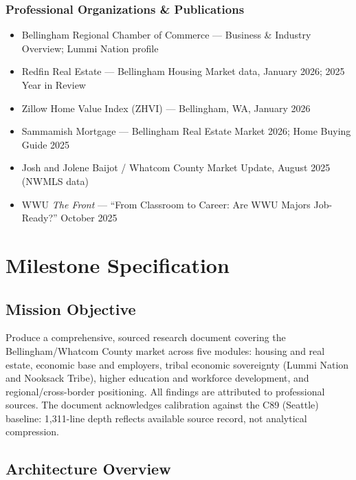 \documentclass[11pt,letterpaper]{article}
\newcommand{\stageheader}[2]{%
  \noindent\colorbox{#2}{\makebox[\textwidth][l]{%
    \textcolor{white}{\bfseries\sffamily\hspace{6pt}#1\hspace{6pt}}}}%
  \vspace{0.5em}\par%
}
\begin{document}
\subsubsection{Professional Organizations \& Publications}
\begin{itemize}[leftmargin=*]
  \item Bellingham Regional Chamber of Commerce --- Business \& Industry Overview; Lummi Nation profile
  \item Redfin Real Estate --- Bellingham Housing Market data, January 2026; 2025 Year in Review
  \item Zillow Home Value Index (ZHVI) --- Bellingham, WA, January 2026
  \item Sammamish Mortgage --- Bellingham Real Estate Market 2026; Home Buying Guide 2025
  \item Josh and Jolene Baijot / Whatcom County Market Update, August 2025 (NWMLS data)
  \item WWU \emph{The Front} --- ``From Classroom to Career: Are WWU Majors Job-Ready?'' October 2025
\end{itemize}

\newpage
\stageheader{STAGE 3 --- MISSION PACKAGE}{tertiary}

\section{Milestone Specification}

\subsection{Mission Objective}

Produce a comprehensive, sourced research document covering the Bellingham/Whatcom County market across five modules: housing and real estate, economic base and employers, tribal economic sovereignty (Lummi Nation and Nooksack Tribe), higher education and workforce development, and regional/cross-border positioning. All findings are attributed to professional sources. The document acknowledges calibration against the C89 (Seattle) baseline: 1,311-line depth reflects available source record, not analytical compression.

\subsection{Architecture Overview}
\end{document}
